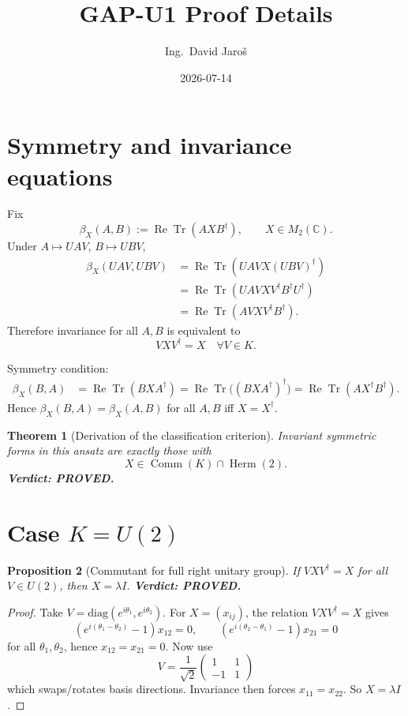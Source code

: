 \documentclass[12pt,a4paper]{article}
\title{GAP-U1 Proof Details}
\author{Ing.\ David Jaroš}
\date{2026-07-14}
\newtheorem{theorem}{Theorem}[section]
\newtheorem{proposition}[theorem]{Proposition}
\theoremstyle{remark}
\begin{document}
\maketitle
\fi

\section{Symmetry and invariance equations}

Fix
\[
\beta_X(A,B):=\operatorname{Re}\operatorname{Tr}(A X B^\dagger),\qquad X\in M_2(\mathbb C).
\]
Under $A\mapsto UAV$, $B\mapsto UBV$,
\begin{align*}
\beta_X(UAV,UBV)
&=\operatorname{Re}\operatorname{Tr}(UAVX(UBV)^\dagger)\\
&=\operatorname{Re}\operatorname{Tr}(UAVXV^\dagger B^\dagger U^\dagger)\\
&=\operatorname{Re}\operatorname{Tr}(AVXV^\dagger B^\dagger).
\end{align*}
Therefore invariance for all $A,B$ is equivalent to
\[
VXV^\dagger=X\quad\forall V\in K.
\]

Symmetry condition:
\begin{align*}
\beta_X(B,A)
&=\operatorname{Re}\operatorname{Tr}(BXA^\dagger)
=\operatorname{Re}\operatorname{Tr}\big((BXA^\dagger)^\dagger\big)
=\operatorname{Re}\operatorname{Tr}(AX^\dagger B^\dagger).
\end{align*}
Hence $\beta_X(B,A)=\beta_X(A,B)$ for all $A,B$ iff $X=X^\dagger$.

\begin{theorem}[Derivation of the classification criterion]
Invariant symmetric forms in this ansatz are exactly those with
\[
X\in\operatorname{Comm}(K)\cap\operatorname{Herm}(2).
\]
\textbf{Verdict: PROVED.}
\end{theorem}

\section{Case $K=U(2)$}

\begin{proposition}[Commutant for full right unitary group]
If $VXV^\dagger=X$ for all $V\in U(2)$, then $X=\lambda I$.
\textbf{Verdict: PROVED.}
\end{proposition}

\begin{proof}
Take $V=\mathrm{diag}(e^{i\theta_1},e^{i\theta_2})$.
For $X=(x_{ij})$, the relation $VXV^\dagger=X$ gives
\[
(e^{i(\theta_1-\theta_2)}-1)x_{12}=0,\qquad (e^{i(\theta_2-\theta_1)}-1)x_{21}=0
\]
for all $\theta_1,\theta_2$, hence $x_{12}=x_{21}=0$.
Now use
\[
V=\frac{1}{\sqrt2}\begin{pmatrix}1&1\\-1&1\end{pmatrix}
\]
which swaps/rotates basis directions. Invariance then forces $x_{11}=x_{22}$.
So $X=\lambda I$.
\end{proof}
\end{document}
